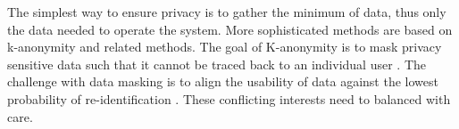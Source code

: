 The simplest way to ensure privacy is to gather the minimum of data, thus only the data needed to operate the system. 
More sophisticated methods are based on k-anonymity and related methods. The goal of K-anonymity is to mask privacy sensitive data such that it cannot be traced back to an individual user \cite{sweeney2002k}. 
The challenge with data masking is to align the usability of data against the lowest probability of re-identification \cite{d2015privacy}. 
These conflicting interests need to balanced with care.





